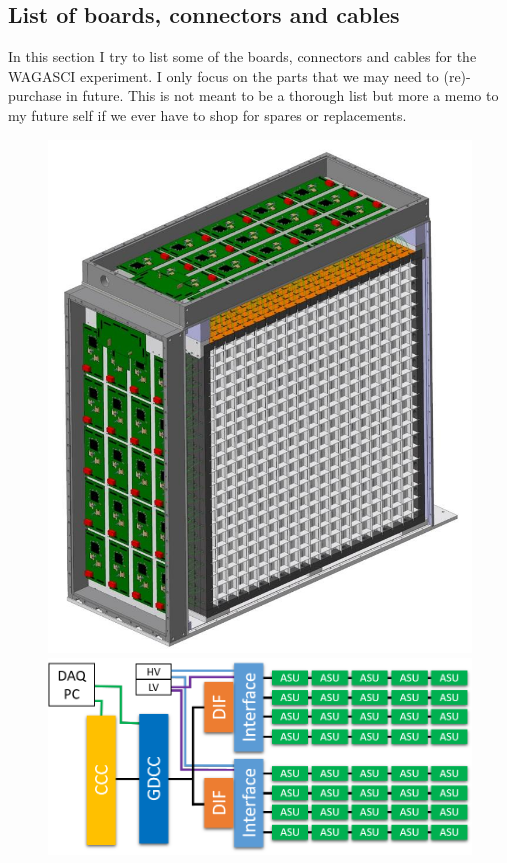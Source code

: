 \subsection{List of boards, connectors and cables}
In this section I try to list some of the boards, connectors and cables for the
WAGASCI experiment. I only focus on the parts that we may need to (re)-purchase
in future. This is not meant to be a thorough list but more a memo to my future
self if we ever have to shop for spares or replacements.
\begin{figure}[ht]
  \centering
  \begin{minipage}{0.48\linewidth}
    \centering
    \includegraphics[width=0.8\linewidth]{WAGASCI-open-view} \\
    \includegraphics[width=0.98\linewidth]{DAQ-overview-WAGASCI}

\end{minipage}
\end{figure}
